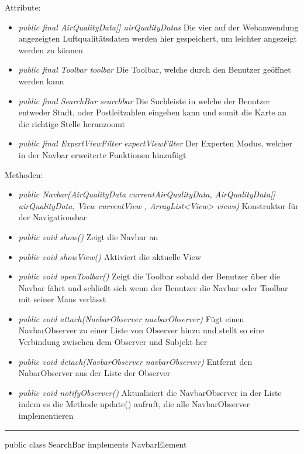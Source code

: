 Attribute:
\begin{itemize}
    \item \emph{public final AirQualityData[] airQualityDatas} Die vier auf der Webanwendung angezeigten Luftqualitätsdaten werden hier gespeichert, um leichter angezeigt werden zu können
    \item \emph{public final Toolbar toolbar} Die Toolbar, welche durch den Benutzer geöffnet werden kann
    \item \emph{public final SearchBar searchbar} Die Suchleiste in welche der Benutzer entweder Stadt, oder Postleitzahlen eingeben kann und somit die Karte an die richtige Stelle heranzoomt
    \item \emph{public final ExpertViewFilter expertViewFilter} Der Experten Modus, welcher in der Navbar erweiterte Funktionen hinzufügt

\end{itemize}
Methoden:
\begin{itemize}
    \item \emph{public Navbar(AirQualityData currentAirQualityData, AirQualityData[] airQualityData, View currentView , ArrayList<View> views)} Konstruktor für der Navigationsbar
    \item \emph{public void show()} Zeigt die Navbar an
    \item \emph{public void showView()} Aktiviert die aktuelle View
    \item \emph{public void openToolbar()} Zeigt die Toolbar sobald der Benutzer über die Navbar fährt und schließt sich wenn der Benutzer die Navbar oder Toolbar mit seiner Maus verlässt
    \item \emph{public void attach(NavbarObserver navbarObserver)} Fügt einen NavbarObserver zu einer Liste von Observer hinzu und stellt so eine Verbindung zwischen dem Observer und Subjekt her
    \item \emph{public void detach(NavbarObserver navbarObserver)} Entfernt den NabarObserver aus der Liste der Observer
    \item \emph{public void notifyObserver()} Aktualisiert die NavbarObserver in der Liste indem es die Methode update() aufruft, die alle NavbarObserver implementieren
\end{itemize}

\clearpage %
\rule{\textwidth}{0.4pt}
public class SearchBar implements NavbarElement

